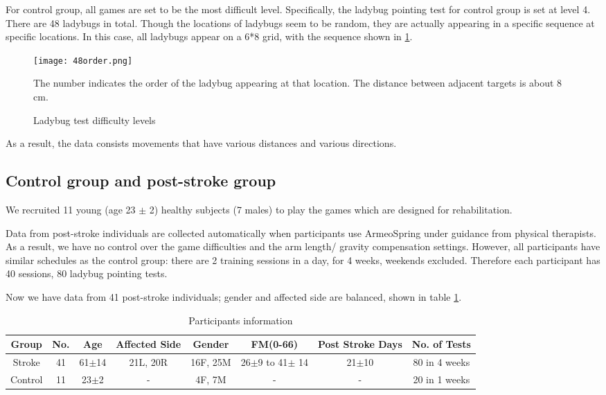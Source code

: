 For control group, all games are set to be the most difficult level. Specifically, the ladybug pointing test for control group is set at level 4. There are 48 ladybugs in total. Though the locations of ladybugs seem to be random, they are actually appearing in a specific sequence at specific locations. In this case, all ladybugs appear on a 6*8 grid, with the sequence shown in \ref{fig:48order}.

\begin{figure}
	\texttt{[image: 48order.png]}
	\centering
	\caption{Ladybug test difficulty levels}
	\medskip
	\small The number indicates the order of the ladybug appearing at that location. The distance between adjacent targets is about 8 cm.
	\label{fig:48order}
\end{figure}

As a result, the data consists movements that have various distances and various directions.

\subsection{Control group and post-stroke group}

We recruited 11 young (age 23 $\pm$ 2) healthy subjects (7 males) to play the games which are designed for rehabilitation.

Data from post-stroke individuals are collected automatically when participants use ArmeoSpring under guidance from physical therapists. As a result, we have no control over the game difficulties and the arm length/ gravity compensation settings. However, all participants have similar schedules as the control group: there are 2 training sessions in a day, for 4 weeks, weekends excluded. Therefore each participant has 40 sessions, 80 ladybug pointing tests.

Now we have data from 41 post-stroke individuals; gender and affected side are balanced, shown in table \ref{tab:demog}. 

\begin{table}[b]
	\begin{tabular}{c c c c c c c c}
	\hline
	Group & No. & Age & Affected Side & Gender & FM(0-66) & Post Stroke Days & No. of Tests\\
	\hline
	Stroke & 41 & 61$\pm$14 & 21L, 20R & 16F, 25M & 26$\pm$9 to 41$\pm$ 14 & 21$\pm$10 & 80 in 4 weeks \\ 
	Control & 11 & 23$\pm$2 & - & 4F, 7M & - & - & 20 in 1 weeks \\
	\hline
	\end{tabular}
	\caption{Participants information}
	\label{tab:demog}
\end{table}

